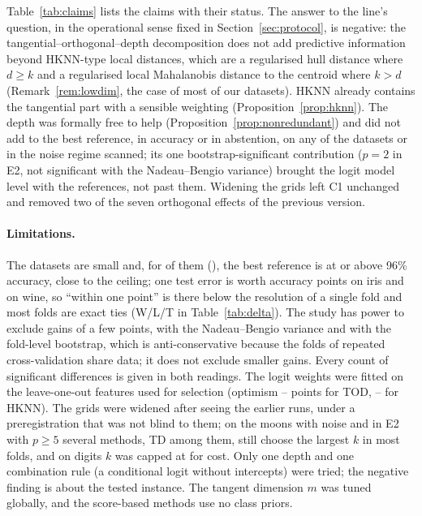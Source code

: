 \documentclass[10pt,a4paper]{article}
\theoremstyle{plain}
\theoremstyle{definition}
\theoremstyle{remark}
\newcommand{\meth}[1]{\textsf{#1}}
\begin{document}
Table~\ref{tab:claims} lists the claims with their status. The answer to the line's question, in the operational sense fixed in Section~\ref{sec:protocol}, is negative: the tangential--orthogonal--depth decomposition does not add predictive information beyond HKNN-type local distances, which are a regularised hull distance where $d\ge k$ and a regularised local Mahalanobis distance to the centroid where $k>d$ (Remark~\ref{rem:lowdim}, the case of most of our datasets). \meth{HKNN} already contains the tangential part with a sensible weighting (Proposition~\ref{prop:hknn}). The depth was formally free to help (Proposition~\ref{prop:nonredundant}) and did not add to the best reference, in accuracy or in abstention, on any of the \NDatasets{} datasets or in the noise regime scanned; its one bootstrap-significant contribution ($p=2$ in E2, not significant with the Nadeau--Bengio variance) brought the logit model level with the references, not past them. Widening the grids left C1 unchanged and removed two of the seven orthogonal effects of the previous version.

\paragraph{Limitations.} The datasets are small and, for \NNearCeiling{} of them (\NearCeilingList), the best reference is at or above 96\% accuracy, close to the ceiling; one test error is worth \FoldResIris{} accuracy points on iris and \FoldResWine{} on wine, so ``within one point'' is there below the resolution of a single fold and most folds are exact ties (W/L/T in Table~\ref{tab:delta}). The study has power to exclude gains of a few points, \CiHiBestMaxNb{} with the Nadeau--Bengio variance and \CiHiBestMax{} with the fold-level bootstrap, which is anti-conservative because the folds of repeated cross-validation share data; it does not exclude smaller gains. Every count of significant differences is given in both readings. The logit weights were fitted on the leave-one-out features used for selection (optimism \OptimTodMin--\OptimTodMax{} points for \meth{TOD}, \OptimHknnMin--\OptimHknnMax{} for \meth{HKNN}). The grids were widened after seeing the earlier runs, under a preregistration that was not blind to them; on the moons with noise and in E2 with $p\ge5$ several methods, \meth{TD} among them, still choose the largest $k$ in most folds, and on digits $k$ was capped at \KTopDigits{} for cost. Only one depth and one combination rule (a conditional logit without intercepts) were tried; the negative finding is about the tested instance. The tangent dimension $m$ was tuned globally, and the score-based methods use no class priors.
\end{document}
